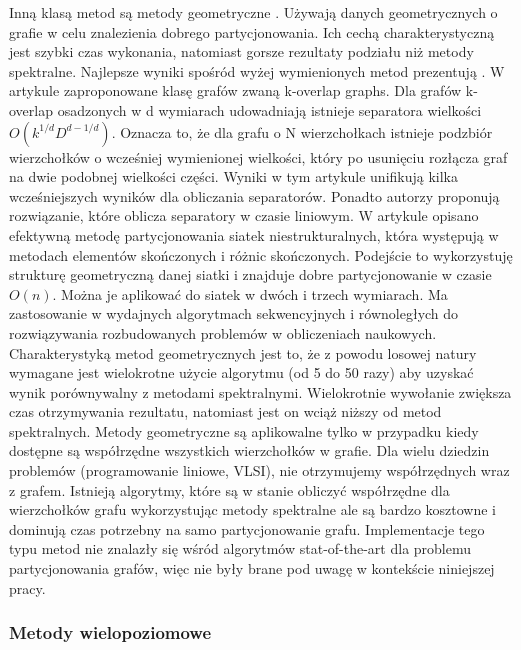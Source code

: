Inną klasą metod są metody geometryczne
\cite{Miller1994ACP, Raghavan93lineand, 185417, MiTeThVa93, NourOmid1987SolvingFE}.
Używają danych geometrycznych o grafie w celu znalezienia dobrego partycjonowania.
Ich cechą charakterystyczną jest szybki czas wykonania, natomiast gorsze rezultaty podziału niż metody spektralne.
Najlepsze wyniki spośród wyżej wymienionych metod prezentują \cite{185417, MiTeThVa93}.
W artykule \cite{185417} zaproponowane klasę grafów zwaną k-overlap graphs. Dla grafów k-overlap osadzonych w d wymiarach
 \cite{wiki:Graph_embedding} udowadniają istnieje separatora wielkości \(O(k^{1/d}D^{{d-1}/d})\).
Oznacza to, że dla grafu o N wierzchołkach istnieje podzbiór
wierzchołków o wcześniej wymienionej wielkości, który po usunięciu rozłącza graf na dwie podobnej wielkości części.
Wyniki w tym artykule unifikują kilka wcześniejszych wyników dla obliczania separatorów.
Ponadto autorzy proponują rozwiązanie, które oblicza separatory w czasie liniowym.
W artykule \cite{MiTeThVa93} opisano efektywną metodę partycjonowania siatek niestrukturalnych, która występują w metodach
elementów skończonych i różnic skończonych. Podejście to wykorzystuję strukturę geometryczną danej siatki i znajduje
dobre partycjonowanie w czasie \(O(n)\). Można je aplikować do siatek w dwóch i trzech wymiarach. Ma zastosowanie
w wydajnych algorytmach sekwencyjnych i równoległych do rozwiązywania rozbudowanych problemów w obliczeniach naukowych.
Charakterystyką metod geometrycznych jest to, że z powodu losowej natury wymagane jest wielokrotne użycie algorytmu
(od 5 do 50 razy) aby uzyskać wynik porównywalny z metodami spektralnymi.
Wielokrotnie wywołanie zwiększa czas otrzymywania rezultatu, natomiast jest
on wciąż niższy od metod spektralnych. Metody geometryczne są aplikowalne tylko w przypadku kiedy dostępne
są współrzędne wszystkich wierzchołków w grafie. Dla wielu dziedzin problemów (programowanie liniowe, VLSI),
nie otrzymujemy współrzędnych wraz z grafem. Istnieją algorytmy, które są w stanie obliczyć współrzędne dla
wierzchołków grafu \cite{Chan95geometricspectral} wykorzystując metody spektralne ale są bardzo kosztowne i dominują czas potrzebny
na samo partycjonowanie grafu.
Implementacje tego typu metod nie znalazły się wśród algorytmów stat-of-the-art dla problemu partycjonowania grafów,
więc nie były brane pod uwagę w kontekście niniejszej pracy.

\newpage

\subsubsection{Metody wielopoziomowe}


